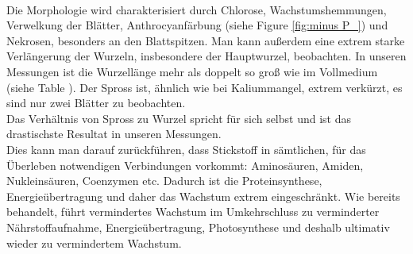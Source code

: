 \documentclass[10pt,a4paper]{article}
\begin{document}
	\\
	Die Morphologie wird charakterisiert durch Chlorose, Wachstumshemmungen, Verwelkung der Blätter, Anthrocyanfärbung (siehe Figure \ref{fig:minus P_}) und Nekrosen, besonders an den Blattspitzen. Man kann außerdem eine extrem starke Verlängerung der Wurzeln, insbesondere der Hauptwurzel, beobachten. In unseren Messungen ist die Wurzellänge mehr als doppelt so groß wie im Vollmedium (siehe Table ). Der Spross ist, ähnlich wie bei Kaliummangel, extrem verkürzt, es sind nur zwei Blätter zu beobachten.\\
	Das Verhältnis von Spross zu Wurzel spricht für sich selbst und ist das drastischste Resultat in unseren Messungen.\\
	Dies kann man darauf zurückführen, dass Stickstoff in sämtlichen, für das Überleben notwendigen Verbindungen vorkommt: Aminosäuren, Amiden, Nukleinsäuren, Coenzymen etc. Dadurch ist die Proteinsynthese, Energieübertragung und daher das Wachstum extrem eingeschränkt. Wie bereits behandelt, führt vermindertes Wachstum im Umkehrschluss zu verminderter Nährstoffaufnahme, Energieübertragung, Photosynthese und deshalb ultimativ wieder zu vermindertem Wachstum. 
	
	
	
\end{document}
